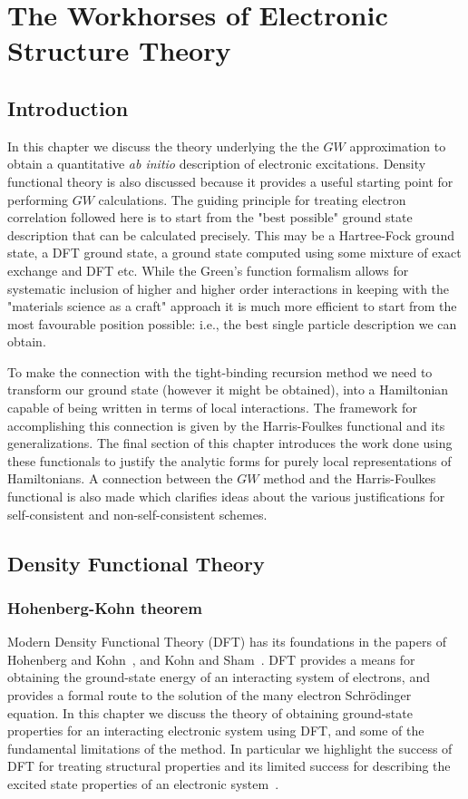 \chapter{The Workhorses of Electronic Structure Theory}
\label{chap:gw}
\noindent
\section{Introduction}
In this chapter we discuss the theory underlying the 
the $GW$ approximation to obtain a quantitative {\it ab initio} 
description of electronic excitations. Density functional theory
is also discussed because it provides a useful starting point for
performing $GW$ calculations. The guiding principle for treating electron 
correlation followed here is to start from the "best possible" ground state description
that can be calculated precisely. This may be a Hartree-Fock ground state,
a DFT ground state, a ground state computed using some mixture of exact exchange
and DFT etc. While the Green's function formalism allows for systematic
inclusion of higher and higher order interactions in keeping with the "materials
science as a craft" approach it is much more efficient to start from the most 
favourable position possible: i.e., the best single particle description we can obtain.

To make the connection with the tight-binding recursion method 
we need to transform our ground state (however it might be obtained), into a
Hamiltonian capable of being written in terms of local interactions. The
framework for accomplishing this connection is given by the Harris-Foulkes
functional and its generalizations. The final section of this chapter
introduces the work done using these functionals to justify
the analytic forms for purely local representations of Hamiltonians.
A connection between the $GW$ method and the Harris-Foulkes functional 
is also made which clarifies ideas about the various justifications 
for self-consistent and non-self-consistent schemes.

\section{Density Functional Theory}
\subsection{Hohenberg-Kohn theorem}

Modern Density Functional Theory (DFT) has its foundations in the 
papers of Hohenberg and Kohn~\cite{hohenbergkohn64}, and Kohn and Sham~\cite{kohnsham65}.
DFT provides a means for obtaining the ground-state energy of an
interacting system of electrons, and provides a formal
route to the solution of the many electron Schr\"odinger equation.
In this chapter we discuss the theory of obtaining ground-state 
properties for an interacting electronic system using DFT, and 
some of the fundamental limitations of the method. In 
particular we highlight the success of DFT for treating structural 
properties and its limited success for describing the excited
state properties of an electronic system~\cite{martin}.

